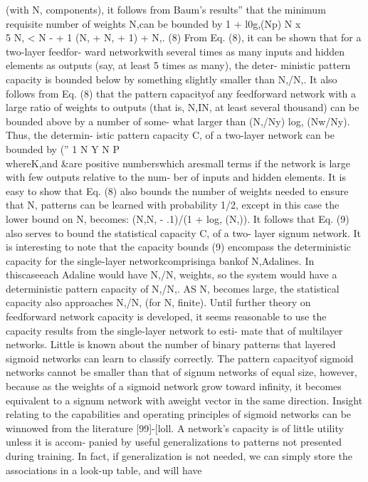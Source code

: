 (with N, components), it follows from Baum's results'' that the minimum
requisite number of weights N,can be bounded by 1 + l0g,(Np) N x\\
5 N, \textless{} N - + 1 (N, + N, + 1) + N,. (8) From Eq. (8), it can be
shown that for a two-layer feedfor- ward networkwith several times as
many inputs and hidden elements as outputs (say, at least 5 times as
many), the deter- ministic pattern capacity is bounded below by
something slightly smaller than N,/N,. It also follows from Eq. (8) that
the pattern capacityof any feedforward network with a large ratio of
weights to outputs (that is, N,IN, at least several thousand) can be
bounded above by a number of some- what larger than (N,/Ny) log,
(Nw/Ny). Thus, the determin- istic pattern capacity C, of a two-layer
network can be bounded by ('' 1 N Y N P\\
whereK,and \&are positive numberswhich aresmall terms if the network is
large with few outputs relative to the num- ber of inputs and hidden
elements. It is easy to show that Eq. (8) also bounds the number of
weights needed to ensure that N, patterns can be learned with
probability 1/2, except in this case the lower bound on N, becomes:
(N,N, - .1)/(1 + log, (N,)). It follows that Eq. (9) also serves to
bound the statistical capacity C, of a two- layer signum network. It is
interesting to note that the capacity bounds (9) encompass the
deterministic capacity for the single-layer networkcomprisinga bankof
N,Adalines. In thiscaseeach Adaline would have N,/N, weights, so the
system would have a deterministic pattern capacity of N,/N,. AS N,
becomes large, the statistical capacity also approaches N,/N, (for N,
finite). Until further theory on feedforward network capacity is
developed, it seems reasonable to use the capacity results from the
single-layer network to esti- mate that of multilayer networks. Little
is known about the number of binary patterns that layered sigmoid
networks can learn to classify correctly. The pattern capacityof sigmoid
networks cannot be smaller than that of signum networks of equal size,
however, because as the weights of a sigmoid network grow toward
infinity, it becomes equivalent to a signum network with aweight vector
in the same direction. Insight relating to the capabilities and
operating principles of sigmoid networks can be winnowed from the
literature {[}99{]}-{[}loll. A network's capacity is of little utility
unless it is accom- panied by useful generalizations to patterns not
presented during training. In fact, if generalization is not needed, we
can simply store the associations in a look-up table, and will have
